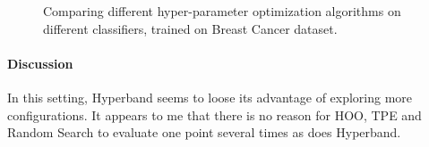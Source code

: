 \documentclass[twoside,11pt]{article}
\begin{document}
\begin{figure}
    \qquad
    \qquad
    \caption{Comparing different hyper-parameter optimization algorithms on different classifiers, trained on Breast Cancer dataset.}%
    \label{fig:breast_cancer}%
\end{figure}

\paragraph{\textbf{Discussion}} In this setting, Hyperband seems to loose its advantage of exploring more configurations. It appears to me that there is no reason for HOO, TPE and Random Search to evaluate one point several times as does Hyperband.

\newpage
\vskip 0.2in



\end{document}
